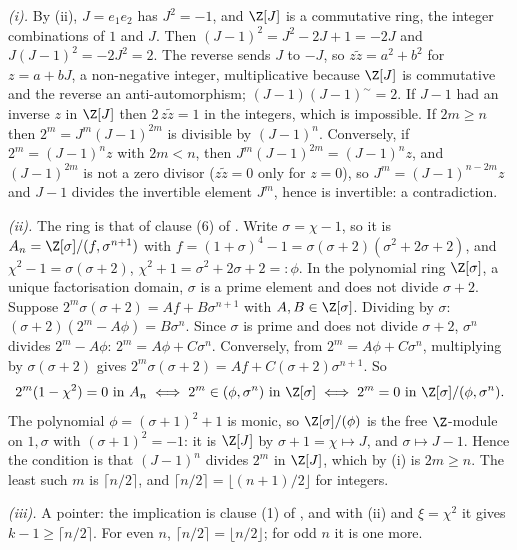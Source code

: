 \emph{(i).} By (ii), $J = e_{1}e_{2}$ has $J^{2} = -1$, and $\Z[J]$ is a commutative ring, the integer combinations of $1$ and $J$. Then $(J - 1)^{2} = J^{2} - 2J + 1 = -2J$ and $J(J - 1)^{2} = -2J^{2} = 2$. The reverse sends $J$ to $-J$, so $z\tilde{z} = a^{2} + b^{2}$ for $z = a + bJ$, a non-negative integer, multiplicative because $\Z[J]$ is commutative and the reverse an anti-automorphism; $(J - 1)(J - 1)^{\sim} = 2$. If $J - 1$ had an inverse $z$ in $\Z[J]$ then $2\,z\tilde{z} = 1$ in the integers, which is impossible. If $2m \ge n$ then $2^{m} = J^{m}(J - 1)^{2m}$ is divisible by $(J - 1)^{n}$. Conversely, if $2^{m} = (J - 1)^{n}z$ with $2m < n$, then $J^{m}(J - 1)^{2m} = (J - 1)^{n}z$, and $(J - 1)^{2m}$ is not a zero divisor ($z\tilde{z} = 0$ only for $z = 0$), so $J^{m} = (J - 1)^{n-2m}z$ and $J - 1$ divides the invertible element $J^{m}$, hence is invertible: a contradiction.

\emph{(ii).} The ring is that of clause (6) of . Write $\sigma = \chi - 1$, so it is $A_{n} = \Z[\sigma]/(f, \sigma^{n+1})$ with $f = (1 + \sigma)^{4} - 1 = \sigma(\sigma + 2)(\sigma^{2} + 2\sigma + 2)$, and $\chi^{2} - 1 = \sigma(\sigma + 2)$, $\chi^{2} + 1 = \sigma^{2} + 2\sigma + 2 =: \phi$. In the polynomial ring $\Z[\sigma]$, a unique factorisation domain, $\sigma$ is a prime element and does not divide $\sigma + 2$. Suppose $2^{m}\sigma(\sigma + 2) = Af + B\sigma^{n+1}$ with $A, B \in \Z[\sigma]$. Dividing by $\sigma$: $(\sigma + 2)(2^{m} - A\phi) = B\sigma^{n}$. Since $\sigma$ is prime and does not divide $\sigma + 2$, $\sigma^{n}$ divides $2^{m} - A\phi$: $2^{m} = A\phi + C\sigma^{n}$. Conversely, from $2^{m} = A\phi + C\sigma^{n}$, multiplying by $\sigma(\sigma + 2)$ gives $2^{m}\sigma(\sigma + 2) = Af + C(\sigma + 2)\sigma^{n+1}$. So
\[
2^{m}(1 - \chi^{2}) = 0 \text{ in } A_{n} \iff 2^{m} \in (\phi, \sigma^{n}) \text{ in } \Z[\sigma] \iff 2^{m} = 0 \text{ in } \Z[\sigma]/(\phi, \sigma^{n}).
\]
The polynomial $\phi = (\sigma + 1)^{2} + 1$ is monic, so $\Z[\sigma]/(\phi)$ is the free $\Z$-module on $1, \sigma$ with $(\sigma + 1)^{2} = -1$: it is $\Z[J]$ by $\sigma + 1 = \chi \mapsto J$, and $\sigma \mapsto J - 1$. Hence the condition is that $(J - 1)^{n}$ divides $2^{m}$ in $\Z[J]$, which by (i) is $2m \ge n$. The least such $m$ is $\lceil n/2 \rceil$, and $\lceil n/2 \rceil = \lfloor (n+1)/2 \rfloor$ for integers.

\emph{(iii).} A pointer: the implication is clause (1) of , and with (ii) and $\xi = \chi^{2}$ it gives $k - 1 \ge \lceil n/2 \rceil$. For even $n$, $\lceil n/2 \rceil = \lfloor n/2 \rfloor$; for odd $n$ it is one more.

